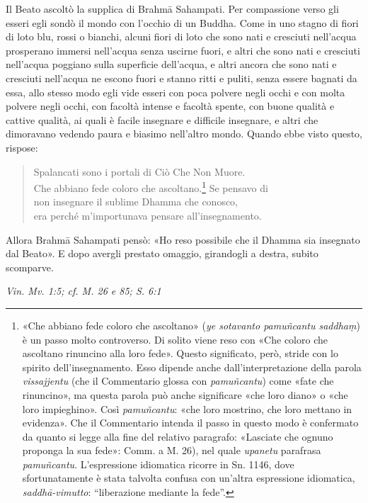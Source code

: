 Il Beato ascoltò la supplica di Brahmā Sahampati. Per compassione verso
gli esseri egli sondò il mondo con l’occhio di un Buddha. Come in uno
stagno di fiori di loto blu, rossi o bianchi, alcuni fiori di loto che
sono nati e cresciuti nell’acqua prosperano immersi nell’acqua senza
uscirne fuori, e altri che sono nati e cresciuti nell’acqua poggiano
sulla superficie dell’acqua, e altri ancora che sono nati e cresciuti
nell’acqua ne escono fuori e stanno ritti e puliti, senza essere bagnati
da essa, allo stesso modo egli vide esseri con poca polvere negli occhi
e con molta polvere negli occhi, con facoltà intense e facoltà spente,
con buone qualità e cattive qualità, ai quali è facile insegnare e
difficile insegnare, e altri che dimoravano vedendo paura e biasimo
nell’altro mondo. Quando ebbe visto questo, rispose:


\begin{quotation}
Spalancati sono i portali di Ciò Che Non Muore. \\
Che abbiano fede coloro che ascoltano.\footnote{«Che abbiano fede coloro che ascoltano» (\emph{ye sotavanto pamuñcantu saddhaṃ}) è un passo molto controverso. Di solito viene reso con «Che coloro che ascoltano rinuncino alla loro fede». Questo significato, però, stride con lo spirito dell’insegnamento. Esso dipende anche dall’interpretazione della parola \emph{vissajjentu} (che il Commentario glossa con \emph{pamuñcantu}) come «fate che rinuncino», ma questa parola può anche significare «che loro diano» o «che loro impieghino». Così \emph{pamuñcantu}: «che loro mostrino, che loro mettano in evidenza». Che il Commentario intenda il passo in questo modo è confermato da quanto si legge alla fine del relativo paragrafo: «Lasciate che ognuno proponga la sua fede»: Comm. a M. 26), nel quale \emph{upanetu} parafrasa \emph{pamuñcantu}. L’espressione idiomatica ricorre in Sn. 1146, dove sfortunatamente è stata talvolta confusa con un’altra espressione idiomatica, \emph{saddhā-vimutto}: “liberazione mediante la fede”.} Se pensavo di \\
non insegnare il sublime Dhamma che conosco, \\
era perché m’importunava pensare all’insegnamento.
\end{quotation}

Allora Brahmā Sahampati pensò: «Ho reso possibile che il Dhamma sia
insegnato dal Beato». E dopo avergli prestato omaggio, girandogli a
destra, subito scomparve.


\emph{Vin. Mv. 1:5; cf. M. 26 e 85; S. 6:1}


